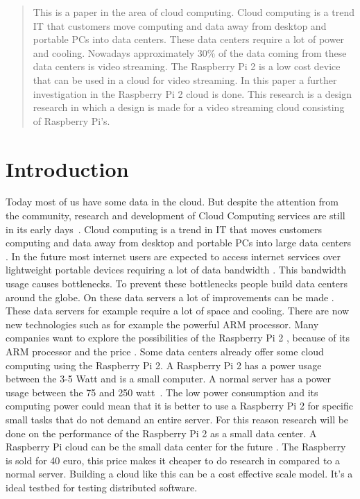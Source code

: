 \documentclass{sig-alternate-br}
\begin{document}
\maketitle
\begin{abstract}
This is a paper in the area of cloud computing. Cloud computing is a trend IT that customers move computing and data away from desktop and portable PCs into data centers. These data centers require a lot of power and cooling. Nowadays approximately 30\% of the data coming from these data centers is video streaming. The Raspberry Pi 2 is a low cost device that can be used in a cloud for video streaming. In this paper a further investigation in the Raspberry Pi 2 cloud is done. This research is a design research in which a design is made for a video streaming cloud consisting of Raspberry Pi's. 
\end{abstract}


\section{Introduction}
Today most of us have some data in the cloud. But despite the attention from the community, research and development of Cloud Computing services are still in its early days~\cite{tso:2013}. \newline
Cloud computing is a trend in IT that moves customers computing and data away from desktop and portable PCs into large data centers \cite{dikaiakos:2009}. In the future most internet users are expected to access internet services over lightweight portable devices requiring a lot of data bandwidth \cite{dikaiakos:2009}. This bandwidth usage causes bottlenecks. To prevent these bottlenecks people build data centers around the globe. On these data servers a lot of improvements can be made \cite{abrahamsson:2013,beloglazov:2010}. 
These data servers for example require a lot of space and cooling. There are now new technologies such as for example the powerful ARM processor. Many companies want to explore the possibilities of the Raspberry Pi 2 , because of its ARM processor and the price \cite{Pcextreme}. Some data centers already offer some cloud computing using the Raspberry Pi 2. \newline
A Raspberry Pi 2 has a power usage between the 3-5 Watt and is a small computer. A normal server has a power usage between the 75 and 250 watt~\cite{Pcextreme,beloglazov2012energy}. The low power consumption and its computing power could mean that it is better to use a Raspberry Pi 2 for specific small tasks that do not demand an entire server. For this reason research will be done on the performance of the Raspberry Pi 2 as a small data center. \newline
A Raspberry Pi cloud can be the small data center for the future \cite{tso:2013}. The Raspberry is sold for 40 euro, this price makes it cheaper to do research in compared to a normal server. Building a cloud like this can be a cost effective scale model\cite{tso:2013}. It's a ideal testbed for testing distributed software. 
\end{document}
